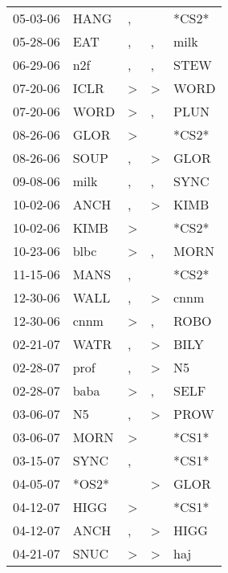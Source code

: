 \begin{supertabular}{lllll}
 05-03-06 &   HANG &                , &                  &  *CS2* \\
 05-28-06 &    EAT &                , &                , &   milk \\
 06-29-06 &    n2f &                , &                , &   STEW \\
 07-20-06 &   ICLR &     \textgreater &     \textgreater &   WORD \\
 07-20-06 &   WORD &     \textgreater &                , &   PLUN \\
 08-26-06 &   GLOR &     \textgreater &                  &  *CS2* \\
 08-26-06 &   SOUP &                , &     \textgreater &   GLOR \\
 09-08-06 &   milk &                , &                , &   SYNC \\
 10-02-06 &   ANCH &                , &     \textgreater &   KIMB \\
 10-02-06 &   KIMB &     \textgreater &                  &  *CS2* \\
 10-23-06 &   blbc &     \textgreater &                , &   MORN \\
 11-15-06 &   MANS &                , &                  &  *CS2* \\
 12-30-06 &   WALL &                , &     \textgreater &   cnnm \\
 12-30-06 &   cnnm &     \textgreater &                , &   ROBO \\
 02-21-07 &   WATR &                , &     \textgreater &   BILY \\
 02-28-07 &   prof &                , &     \textgreater &     N5 \\
 02-28-07 &   baba &     \textgreater &                , &   SELF \\
 03-06-07 &     N5 &                , &     \textgreater &   PROW \\
 03-06-07 &   MORN &     \textgreater &                  &  *CS1* \\
 03-15-07 &   SYNC &                , &                  &  *CS1* \\
 04-05-07 &  *OS2* &                  &     \textgreater &   GLOR \\
 04-12-07 &   HIGG &     \textgreater &                  &  *CS1* \\
 04-12-07 &   ANCH &                , &     \textgreater &   HIGG \\
 04-21-07 &   SNUC &     \textgreater &     \textgreater &    haj \\

\end{supertabular}
